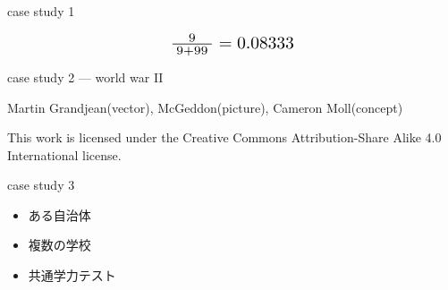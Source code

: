 \documentclass[
  ignorenonframetext,
]{beamer}
\begin{document}
\begin{frame}{case study 1}
\protect\hypertarget{case-study-1-5}{}
\begin{center}\Huge               
\[
 \scalebox{1.4}{$\frac{9}{\;9 + 99\;}=0.08333$}
\]
\end{center}
\end{frame}

\begin{frame}{}
\protect\hypertarget{section-2}{}
\Huge

\scalebox{1.4}{\textcolor{softblue}{事例2}}
\end{frame}

\begin{frame}{case study 2 --- world war II}
\protect\hypertarget{case-study-2-world-war-ii}{}
\raggedleft


\tiny

\raggedleft

Martin Grandjean(vector), McGeddon(picture), Cameron Moll(concept)

\vspace{-5pt}

This work is licensed under the Creative Commons Attribution-Share Alike
4.0 International license.

\pause

\Huge
\vspace{-120pt}

\vspace{-130pt}
\end{frame}

\begin{frame}{}
\protect\hypertarget{section-3}{}
\Huge

\scalebox{1.4}{\textcolor{softblue}{事例3}}
\end{frame}

\begin{frame}{case study 3}
\protect\hypertarget{case-study-3}{}
\Huge

\begin{itemize}
\item[\textbullet] ある自治体
\item[\textbullet] 複数の学校
\item[\textbullet] 共通学力テスト
\end{itemize}
\end{frame}
\end{document}
